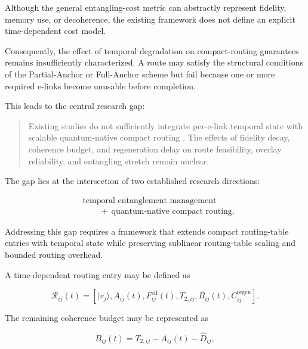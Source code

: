 Although the general entangling-cost metric can abstractly represent fidelity, memory use, or decoherence, the existing framework does not define an explicit time-dependent cost model.

Consequently, the effect of temporal degradation on compact-routing guarantees remains insufficiently characterized. A route may satisfy the structural conditions of the Partial-Anchor or Full-Anchor scheme but fail because one or more required e-links become unusable before completion.

This leads to the central research gap:

\begin{quote}
Existing studies do not sufficiently integrate per-e-link temporal state with
scalable quantum-native compact routing
\cite{ercetin2026fidelityage,ceran2026age,caleffi2025quantumarchitecture}.
The effects of fidelity decay, coherence budget, and regeneration delay on
route feasibility, overlay reliability, and entangling stretch remain unclear.
\end{quote}

The gap lies at the intersection of two established research directions:

\begin{equation}
\begin{aligned}
&\text{temporal entanglement management}
\\
&\qquad +\ \text{quantum-native compact routing}.
\end{aligned}
\end{equation}

Addressing this gap requires a framework that extends compact routing-table entries with temporal state while preserving sublinear routing-table scaling and bounded routing overhead.

A time-dependent routing entry may be defined as

\begin{equation}
    \mathcal{R}_{ij}(t)
    =
    \left[
    |v_j\rangle,
    A_{ij}(t),
    F_{ij}^{\mathrm{eff}}(t),
    T_{2,ij},
    B_{ij}(t),
    C_{ij}^{\mathrm{regen}}
    \right].
\end{equation}

The remaining coherence budget may be represented as

\begin{equation}
    B_{ij}(t)
    =
    T_{2,ij}
    -
    A_{ij}(t)
    -
    \widehat{D}_{ij},
\end{equation}

